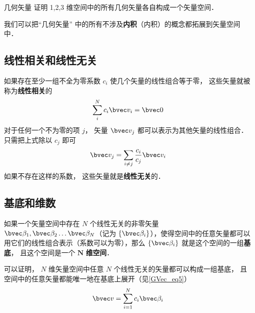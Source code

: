\begin{exercise}{几何矢量}
证明 1,2,3 维空间中的所有几何矢量各自构成一个矢量空间．
\end{exercise}

我们可以把“几何矢量” 中的所有不涉及\textbf{内积}（内积）的概念都拓展到矢量空间中．

\subsection{线性相关和线性无关}
如果存在至少一组不全为零系数 $c_i$ 使几个矢量的线性组合等于零， 这些矢量就被称为\textbf{线性相关}的
\begin{equation}
\sum_i^N c_i \bvec v_i = \bvec 0
\end{equation}
对于任何一个不为零的项 $j$， 矢量 $\bvec v_j$ 都可以表示为其他矢量的线性组合． 只需把上式除以 $c_j$ 即可
\begin{equation}
\bvec v_j = \sum_{i \ne j}\frac{c_i}{c_j} \bvec v_i
\end{equation}
如果不存在这样的系数， 这些矢量就是\textbf{线性无关}的． 

\subsection{基底和维数}
如果一个矢量空间中存在 $N$ 个线性无关的非零矢量 $\bvec \beta_1, \bvec \beta_2 \dots \bvec \beta_N$（记为 $\{\bvec \beta_i\}$），使得空间中的任意矢量都可以用它们的线性组合表示（系数可以为零），那么 $\{\bvec \beta_i\}$ 就是这个空间的一组\textbf{基底}， 且这个空间是一个 $\boldsymbol{N}$ \textbf{维空间}．

可以证明， $N$ 维矢量空间中任意 $N$ 个线性无关的矢量都可以构成一组基底， 且空间中的任意矢量都能唯一地在基底上展开（见\autoref{GVec_eq5}）
\begin{equation}
\bvec v = \sum_{i=1}^N c_i \bvec \beta_i
\end{equation}

